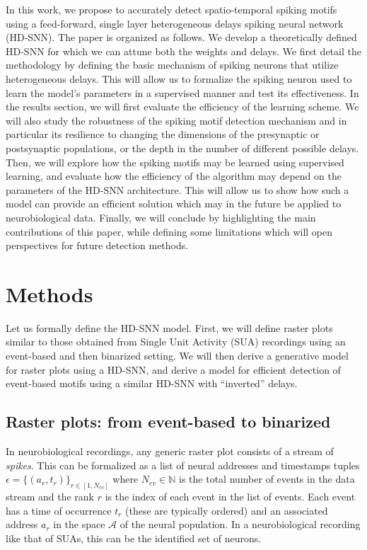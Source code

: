 \documentclass[runningheads]{llncs}
\newcommand{\presynaddr}{a} %
\newcommand{\numevent}{N_{ev}} %
\newcommand{\presynaddrspace}{\mathcal{A}} %
\newcommand{\arank}{r} %
\newcommand{\timev}{t} %
\newcommand{\event}{\epsilon} %
\begin{document}
In this work, we propose to accurately detect spatio-temporal spiking motifs using a feed-forward, single layer heterogeneous delays spiking neural network (HD-SNN). The paper is organized as follows. We develop a theoretically defined HD-SNN for which we can attune both the weights and delays. We first detail the methodology by defining the basic mechanism of spiking neurons that utilize heterogeneous delays. 
This will allow us to formalize the spiking neuron used to learn the model's parameters in a supervised manner and test its effectiveness. In the results section, we will first evaluate the efficiency of the learning scheme. We will also study the robustness of the spiking motif detection mechanism and in particular its resilience to changing the dimensions of the presynaptic or postsynaptic populations, or the depth in the number of different possible delays. Then, we will explore how the spiking motifs may be learned using supervised learning, and evaluate how the efficiency of the algorithm may depend on the parameters of the HD-SNN architecture. This will allow us to show how such a model can provide an efficient solution which may in the future be applied to neurobiological data.  Finally, we will conclude by highlighting the main contributions of this paper, while defining some limitations which will open perspectives for future detection methods. %
%
\section{Methods}
\label{sec:methods}
Let us formally define the HD-SNN model. First, we will define raster plots similar to those obtained from Single Unit Activity (SUA) recordings using an event-based and then binarized setting. We will then derive a generative model for raster plots using a HD-SNN, and derive a model for efficient detection of event-based motifs using a similar HD-SNN with ``inverted'' delays.
%
\subsection{Raster plots: from event-based to binarized}
%
In neurobiological recordings, %
any generic raster plot consists of a stream of \emph{spikes}. This can be formalized as a list of neural addresses and timestamps tuples $\event = \{(\presynaddr_\arank, \timev_\arank)\}_{\arank \in [1,\numevent]}$ where $\numevent \in \mathbb{N}$ is the total number of events in the data stream and the rank $\arank$ is the index of each event in the list of events. Each event has a time of occurrence $\timev_\arank$ (these are typically ordered) and an associated address $\presynaddr_\arank$ in the space $\presynaddrspace$ of the neural population. In a neurobiological recording like that of SUAs, this can be the identified set of neurons.
\end{document}
